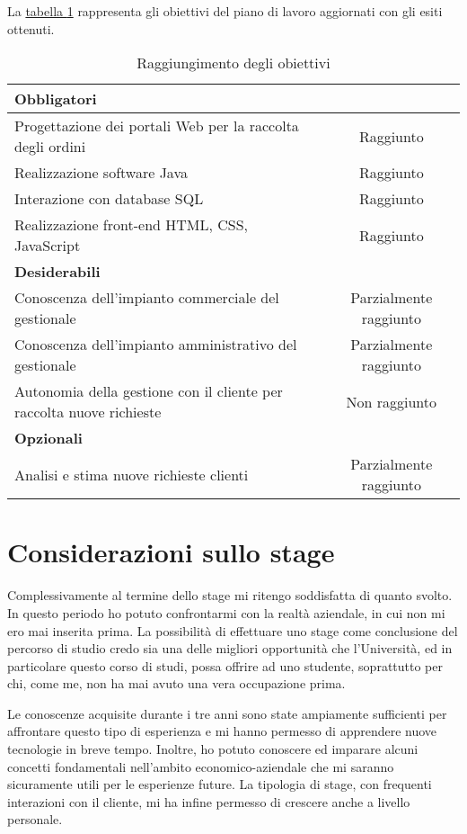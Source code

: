 La \hyperref[tab:obiettivi-2]{tabella \ref{tab:obiettivi-2}} rappresenta gli obiettivi del piano di lavoro aggiornati con gli esiti ottenuti.
\begin{table}
	\centering
	\begin{tabular}{|m{9.3cm}|c|}
		\hline
		\multicolumn{2}{|l|}{\textbf{Obbligatori}} \\
		\hline
		Progettazione dei portali Web per la raccolta degli ordini & Raggiunto \\
		\hline
		Realizzazione software Java & Raggiunto \\
		\hline
		Interazione con database SQL & Raggiunto \\
		\hline
		Realizzazione front-end HTML, CSS, JavaScript & Raggiunto \\
		\hline
		\multicolumn{2}{|l|}{\textbf{Desiderabili}}\\
		\hline
		Conoscenza dell'impianto commerciale del gestionale & Parzialmente raggiunto \\
		\hline
		Conoscenza dell'impianto amministrativo del gestionale & Parzialmente raggiunto \\
		\hline
		Autonomia della gestione con il cliente per raccolta nuove richieste & Non raggiunto \\
		\hline
		\multicolumn{2}{|l|}{\textbf{Opzionali}} \\
		\hline
		Analisi e stima nuove richieste clienti & Parzialmente raggiunto \\
		\hline
	\end{tabular}
	\caption{Raggiungimento degli obiettivi}
	\label{tab:obiettivi-2}
\end{table}

\section{Considerazioni sullo stage}
Complessivamente al termine dello stage mi ritengo soddisfatta di quanto svolto. In questo periodo ho potuto confrontarmi con la realtà aziendale, in cui non mi ero mai inserita prima. La possibilità di effettuare uno stage come conclusione del percorso di studio credo sia una delle migliori opportunità che l'Università, ed in particolare questo corso di studi, possa offrire ad uno studente, soprattutto per chi, come me, non ha mai avuto una vera occupazione prima. 

Le conoscenze acquisite durante i tre anni sono state ampiamente sufficienti per affrontare questo tipo di esperienza e mi hanno permesso di apprendere nuove tecnologie in breve tempo. Inoltre, ho potuto conoscere ed imparare alcuni concetti fondamentali nell'ambito economico-aziendale che mi saranno sicuramente utili per le esperienze future. La tipologia di stage, con frequenti interazioni con il cliente, mi ha infine permesso di crescere anche a livello personale.
